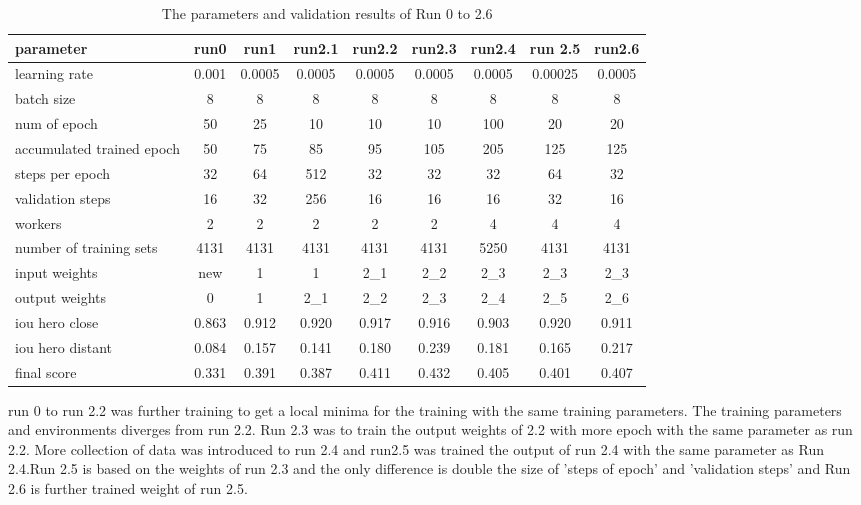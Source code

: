 \documentclass[paper=a4, fontsize=11pt]{scrartcl} %
\numberwithin{equation}{section} %
\numberwithin{figure}{section} %
\numberwithin{table}{section} %
\begin{document}
\begin{table}
	\begin{center}
		\begin{tabular}{ l | c | c | c | c | c | c | c| c }
		\hline
		parameter & run0 & run1 & run2.1 & run2.2 & run2.3 & run2.4 & run 2.5 & run2.6\\ \hline
		learning rate & 0.001 & 0.0005 & 0.0005 & 0.0005 & 0.0005 & 0.0005& 0.00025& 0.0005\\ \hline
		batch size    & 8 & 8 & 8 & 8 & 8 & 8  & 8 & 8\\ \hline
		num of epoch  & 50 & 25 & 10  &  10 &  10 & 100 & 20 & 20\\ \hline
		accumulated trained epoch & 50 & 75 & 85 & 95  & 105 & 205 & 125 & 125\\ \hline
		steps per epoch & 32 & 64 & 512 & 32 & 32 & 32 & 64 & 32\\ \hline
		validation steps & 16 & 32 & 256 & 16 & 16 & 16 & 32 & 16\\ \hline
		workers & 2 & 2 & 2 & 2 & 2 & 4 & 4 & 4 \\ \hline
		number of training sets & 4131 & 4131 & 4131 & 4131 & 4131 & 5250 & 4131 & 4131\\ \hline
		input weights & new & 1 & 1 & 2\_1 & 2\_2  & 2\_3 & 2\_3 & 2\_3\\ \hline
		output weights & 0 & 1 & 2\_1 & 2\_2 & 2\_3 & 2\_4 & 2\_5 & 2\_6\\
		\hline \hline
		iou hero close &0.863 & 0.912 & 0.920 & 0.917 & 0.916 & 0.903 & 0.920 & 0.911\\ \hline	  
		iou hero distant & 0.084 & 0.157 & 0.141 & 0.180 & 0.239 & 0.181 & 0.165 & 0.217\\ \hline
		final score & 0.331& 0.391 & 0.387 & 0.411 & 0.432 & 0.405 & 0.401 & 0.407\\
		\hline
		\end{tabular}
		\caption{The parameters and validation results of Run 0 to 2.6}
		\label{tab:parameters2}
	\end{center}
\end{table}
run 0 to run 2.2 was further training to get a local minima for the training with the same training parameters. The training parameters and environments diverges from run 2.2. Run 2.3 was to train the output weights of 2.2 with more epoch with the same parameter as run 2.2. More collection of data was introduced to run 2.4 and run2.5 was trained the output of run 2.4 with the same parameter as Run 2.4.Run 2.5 is based on the weights of run 2.3 and the only difference is double the size of 'steps of epoch' and 'validation steps' and Run 2.6 is further trained weight of run 2.5.
\end{document}
